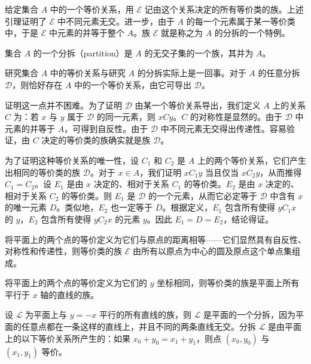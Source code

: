 \documentclass[../../main.tex]{subfiles}
\begin{document}
给定集合 $A$ 中的一个等价关系，用 $\mathcal{E}$ 记由这个关系决定的所有等价类的族。上述引理证明了 $\mathcal{E}$ 中不同元素无交。进一步，由于 $A$ 的每一个元素属于某一等价类中，于是 $\mathcal{E}$ 中元素的并等于整个 $A$。族 $\mathcal{E}$ 就是称之为 $A$ 的分拆的一个特例。

\begin{definition}[分拆]\label{definition:ch01-分拆}
集合 $A$ 的一个分拆（partition）是 $A$ 的无交子集的一个族，其并为 $A$。
\end{definition}

研究集合 $A$ 中的等价关系与研究 $A$ 的分拆实际上是一回事。对于 $A$ 的任意分拆 $\mathcal{D}$，则恰好存在 $A$ 中的一个等价关系，由它可导出 $\mathcal{D}$。

证明这一点并不困难。为了证明 $\mathcal{D}$ 由某一个等价关系导出，我们定义 $A$ 上的关系 $C$ 为：若 $x$ 与 $y$ 属于 $\mathcal{D}$ 的同一元素，则 $xCy$。$C$ 的对称性是显然的。由于 $\mathcal{D}$ 中元素的并等于 $A$，可得到自反性。由于 $\mathcal{D}$ 中不同元素无交得出传递性。容易验证，由 $C$ 决定的等价类的族确实就是族 $\mathcal{D}$。

为了证明这种等价关系的唯一性，设 $C_{1}$ 和 $C_{2}$ 是 $A$ 上的两个等价关系，它们产生出相同的等价类的族 $\mathcal{D}$。对于 $x \in A$，我们证明 $xC_{1}y$ 当且仅当 $xC_{2}y$，从而推得 $C_{1} = C_{2}$。设 $E_{1}$ 是由 $x$ 决定的、相对于关系 $C_{1}$ 的等价类。$E_{2}$ 是由 $x$ 决定的、相对于关系 $C_{2}$ 的等价类。则 $E_{1}$ 是 $\mathcal{D}$ 的一个元素，从而它必定等于 $\mathcal{D}$ 中含有 $x$ 的唯一元素 $D$。类似地，$E_{2}$ 也一定等于 $D$。根据定义，$E_{1}$ 包含所有使得 $yC_{1}x$ 的 $y$，$E_{2}$ 包含所有使得 $yC_{2}x$ 的元素 $y$。因此 $E_{1} = D = E_{2}$，结论得证。

\begin{example}\label{example:ch01-等价类圆}
将平面上的两个点的等价定义为它们与原点的距离相等——它们显然具有自反性、对称性和传递性，则等价类的族 $\mathcal{E}$ 由所有以原点为中心的圆及原点这个单点集组成。
\end{example}

\begin{example}\label{example:ch01-等价类水平线}
将平面上的两个点的等价定义为它们的 $y$ 坐标相同，则等价类的族是平面上所有平行于 $x$ 轴的直线的族。
\end{example}

\begin{example}\label{example:ch01-分拆线族}
设 $\mathcal{L}$ 为平面上与 $y = -x$ 平行的所有直线的族，则 $\mathcal{L}$ 是平面的一个分拆，因为平面的任意点都在一条这样的直线上，并且不同的两条直线无交。分拆 $\mathcal{L}$ 是由平面上的以下等价关系所产生的：如果 $x_{0} + y_{0} = x_{1} + y_{1}$，则点 $(x_{0}, y_{0})$ 与 $(x_{1}, y_{1})$ 等价。
\end{example}
\end{document}
